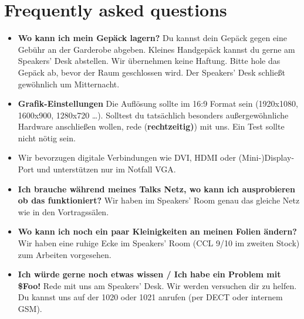 \documentclass[paper=a4]{scrartcl}
\begin{document}
\section*{Frequently asked questions}
\begin{itemize}
	\item \textbf{Wo kann ich mein Gepäck lagern?} Du kannst dein Gepäck gegen eine Gebühr an der Garderobe abgeben. Kleines Handgepäck kannst du gerne am Speakers' Desk abstellen. Wir übernehmen keine Haftung. Bitte hole das Gepäck ab, bevor der Raum geschlossen wird. Der Speakers' Desk schließt gewöhnlich um Mitternacht.
	\item \textbf{Grafik-Einstellungen} Die Auflösung sollte im 16:9 Format sein (1920x1080, 1600x900, 1280x720 \ldots). Solltest du tatsächlich besonders außergewöhnliche Hardware anschließen wollen, rede (\textbf{rechtzeitig)}) mit uns. Ein Test sollte nicht nötig sein.
	\item Wir bevorzugen digitale Verbindungen wie DVI, HDMI oder (Mini-)Display-Port und unterstützen nur im Notfall VGA.
	\item \textbf{Ich brauche während meines Talks Netz, wo kann ich ausprobieren ob das funktioniert?} Wir haben im Speakers' Room genau das gleiche Netz wie in den Vortragssälen.
	\item \textbf{Wo kann ich noch ein paar Kleinigkeiten an meinen Folien ändern?}
	 Wir haben eine ruhige Ecke im Speakers' Room (CCL 9/10 im zweiten Stock) zum Arbeiten vorgesehen.
	\item \textbf{Ich würde gerne noch etwas wissen / Ich habe ein Problem mit \$Foo!} Rede mit uns am Speakers' Desk. Wir werden versuchen dir zu helfen. Du kannst uns auf der 1020 oder 1021 anrufen (per DECT oder internem GSM).
\end{itemize}
\end{document}
